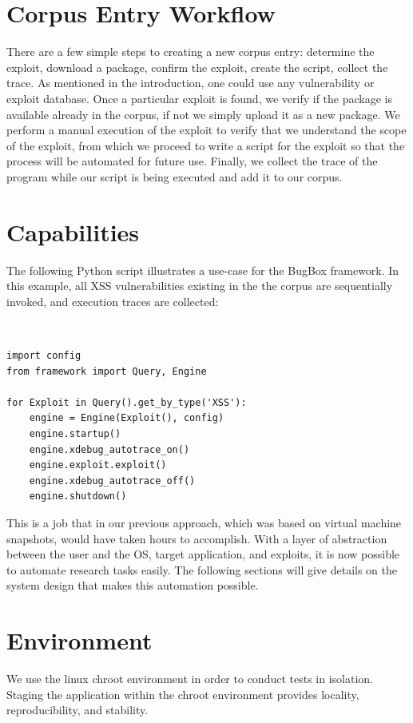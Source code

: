 \documentclass[letterpaper,twocolumn,10pt]{article}
\begin{document}
\section{Corpus Entry Workflow}

There are a few simple steps to creating a new corpus entry: determine the exploit, download a package, confirm the exploit, create the script, collect the trace.  As mentioned in the introduction, one could use any vulnerability or exploit database.   Once a particular exploit is found, we verify if the package is available already in the corpus, if not we simply upload it as a new package.  We perform a manual execution of the exploit to verify that we understand the scope of the exploit, from which we proceed to write a script for the exploit so that the process will be automated for future use.  Finally, we collect the trace of the program while our script is being executed and add it to our corpus.

\section{Capabilities}

The following Python script illustrates a use-case for the BugBox framework. In this example, all XSS vulnerabilities existing in the the corpus are sequentially invoked, and execution traces are collected:

{\tt \footnotesize
\begin{verbatim}
import config
from framework import Query, Engine

for Exploit in Query().get_by_type('XSS'):
    engine = Engine(Exploit(), config)
    engine.startup()
    engine.xdebug_autotrace_on()
    engine.exploit.exploit()
    engine.xdebug_autotrace_off()
    engine.shutdown()
\end{verbatim}
}

This is a job that in our previous approach, which was based on virtual machine snapshots, would have taken hours to accomplish. With a layer of abstraction between the user and the OS, target application, and exploits, it is now possible to automate research tasks easily. The following sections will give details on the system design that makes this automation possible.

\section{Environment}

We use the linux chroot environment in order to conduct tests in isolation.  Staging the application within the chroot environment provides locality, reproducibility, and stability.\\
\end{document}
